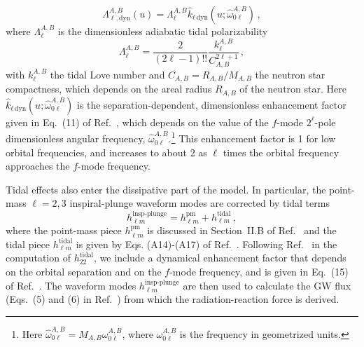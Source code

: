 \documentclass[prd,aps,letter,twocolumn,floatfix,notitlepage,nofootinbib]{revtex4-1}
\begin{document}
\begin{equation}
\Lambda_{\ell,\textrm{dyn}}^{A,B}(u)=\Lambda_{\ell}^{A,B}\hat{k}_{\ell\,\textrm{dyn}}(u;\hat{\omega}_{0\ell}^{A,B})\,,
\end{equation}
where $\Lambda_{\ell}^{A,B}$ is the dimensionless adiabatic tidal polarizability
\begin{equation}
\Lambda_{\ell}^{A,B}=\frac{2}{(2\ell-1)!!}\frac{k^{A,B}_{\ell}}{C_{A,B}^{2\ell+1}}\,,
\end{equation}
with $k^{A,B}_{\ell}$ the tidal Love number and $C_{A,B}=R_{A,B}/M_{A,B}$ the neutron star compactness, which depends on the areal radius $R_{A,B}$ of the neutron star. Here $\hat{k}_{\ell\,\textrm{dyn}}(u;\hat{\omega}_{0\ell}^{A,B})$ is the separation-dependent, dimensionless enhancement factor given in Eq.~(11) of Ref.~\cite{Dietrich:2017feu}, which depends on the value of the $f$-mode $2^\ell$-pole dimensionless angular frequency, $\hat{\omega}_{0\ell}^{A,B}$.\footnote{Here $\hat{\omega}_{0\ell}^{A,B}=M_{A,B}\omega_{0\ell}^{A,B}$, where $\omega_{0\ell}^{A,B}$ is the frequency in geometrized units.} This enhancement factor is 1 for low orbital frequencies, and increases to about 2 as $\ell$ times the orbital frequency approaches the $f$-mode frequency. 

Tidal effects also enter the dissipative part of the model. In particular, the point-mass $\ell=2,3$ inspiral-plunge waveform modes are corrected by tidal terms
\begin{equation}
h_{\ell m}^{\textrm{insp-plunge}} = h_{\ell m}^{\textrm{pm}} + h_{\ell m}^{\textrm{tidal}}\,,\label{hlminspplunge}
\end{equation} 
where the point-mass piece $h_{\ell m}^{\textrm{pm}}$ is discussed in Section~II.B of Ref.~\cite{Bohe:2016gbl} and the tidal piece $h_{\ell m}^{\textrm{tidal}}$ is given by Eqs. (A14)-(A17) of Ref.~\cite{Damour:2012yf}. Following Ref.~\cite{Dietrich:2017feu} in the computation of $h_{22}^{\textrm{tidal}}$, we include a dynamical enhancement factor that depends on the orbital separation and on the $f$-mode frequency, and is given in Eq.~(15) of Ref.~\cite{Dietrich:2017feu}. The waveform modes $h_{\ell m}^{\textrm{insp-plunge}}$ are then used to calculate the GW flux (Eqs.~(5) and (6) in Ref.~\cite{Dietrich:2017feu}) from which the radiation-reaction force is derived.
\end{document}
